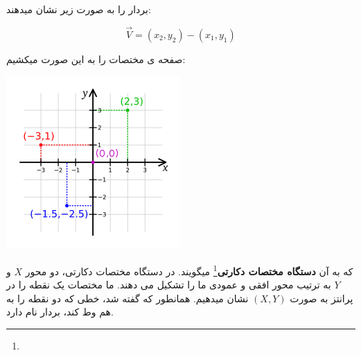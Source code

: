 \documentclass[14pt,a4paper]{memoir}
\begin{document}
بردار را به صورت زیر نشان میدهند:

\[ \vec{V} = (x_2, y_2) - (x_1, y_1) \]
	 
	 صفحه ی مختصات را به این صورت میکشیم: \vfill
	 \begin{center}
	 	\includegraphics*[scale = 1]{coordinate_system}
	 \end{center}
	 
	 که به آن \textbf{دستگاه مختصات دکارتی}\footnote{} میگویند. در دستگاه مختصات دکارتی، دو محور $ X $ و $ Y $ به ترتیب محور افقی و عمودی ما را تشکیل می دهند. ما مختصات یک نقطه را در پرانتز به صورت $ (X, Y) $ نشان میدهیم. همانطور که گفته شد، خطی که دو نقطه را به هم وط کند، بردار نام دارد.
	 
\end{document}
